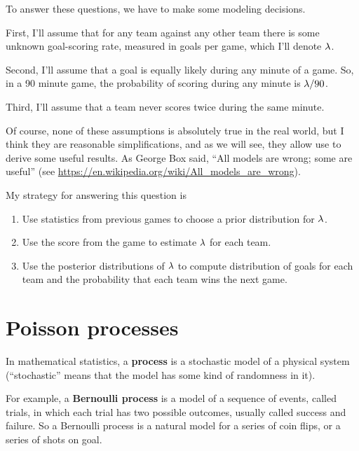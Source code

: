 \documentclass[12pt]{book}
\theoremstyle{exercise}
\begin{document}
To answer these questions, we have to make some modeling decisions.

First, I'll assume that for any team against any other team there is some unknown goal-scoring rate, measured in goals per game, which I'll denote 
$\mathtt{\lambda}$.

Second, I'll assume that a goal is equally likely during any minute of a game.  So, in a 90 minute game, the probability of scoring during any minute is $\mathtt{\lambda} / 90$.

Third, I'll assume that a team never scores twice during the same minute.

Of course, none of these assumptions is absolutely true in the real world, but I think they are reasonable simplifications, and as we will see, they allow use to derive some useful results.
As George Box said, ``All models are wrong; some are useful''
(see \url{https://en.wikipedia.org/wiki/All_models_are_wrong}).

My strategy for answering this question is

\begin{enumerate}

\item Use statistics from previous games to choose a prior
distribution for $\mathtt{\lambda}$.

\item Use the score from the game to estimate $\mathtt{\lambda}$ for each team.

\item Use the posterior distributions of $\mathtt{\lambda}$ to compute 
distribution of goals for each team and the probability that each team wins
the next game.

\end{enumerate}

\section{Poisson processes}

In mathematical statistics, a {\bf process} is a stochastic model of a
physical system (``stochastic'' means that the model has some kind of
randomness in it).  

For example, a {\bf Bernoulli process} is a model of a
sequence of events, called trials, in which each trial has two
possible outcomes, usually called success and failure.  
So a Bernoulli process
is a natural model for a series of coin flips, or a series of shots on
goal.  
\end{document}

